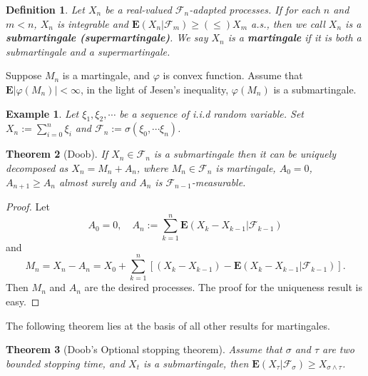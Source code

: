\documentclass[twoside, 12pt]{book}
\numberwithin{equation}{chapter}
\newtheorem{theorem}{Theorem}[section]
\newtheorem{definition}[theorem]{Definition}
\newtheorem{example}{Example}
\def\cF{{\mathcal F}}
\def\bE{{\mathbf E}}
\def\l{\left}
\def\r{\right}
\def\geq{\geqslant}
\def\leq{\leqslant}
\begin{document}
	\begin{definition}
		Let $X_n$ be a real-valued $\cF_n$-adapted processes. If for each $n$ and $m<n$, $X_n$ is integrable and $\bE(X_n | \cF_m) \geq (\leq) X_m$ a.s., then we call $X_n$ is a {\bf submartingale (supermartingale)}. We say $X_n$ is a {\bf martingale} if it is both a submartingale and a supermartingale. 
	\end{definition}
	Suppose $M_n$ is a martingale, and $\varphi$ is convex function. Assume that $\bE |\varphi(M_n)|<\infty$, in the light of Jesen's inequality, $\varphi(M_n)$ is a submartingale. 
	
	\begin{example}
		Let $\xi_1, \xi_2, \cdots$ be a sequence of i.i.d random variable. Set $X_n:=\sum_{i=0}^n \xi_i$ and $\cF_n:=\sigma(\xi_0,\cdots \xi_n)$. 
	\end{example}
	
 
	\begin{theorem}[Doob]\label{thm:Doob-D}
 If $X_n\in \cF_n$  is a submartingale then it can be uniquely decomposed as $X_n=M_n+A_n$, where $M_n\in \cF_n$ is martingale, $A_0=0$, $A_{n+1}\geq A_n$ almost surely and $A_n$ is $\cF_{n-1}$-measurable.
	\end{theorem}
	\begin{proof}
		Let 
		\begin{equation*}
			A_0=0, \quad A_n:=\sum_{k=1}^n\bE (X_{k}-X_{k-1}|\cF_{k-1})
		\end{equation*}
		and 
		\[
		    M_n=X_n-A_n= X_0+ \sum_{k=1}^n \l[ (X_k-X_{k-1})- \bE (X_{k}-X_{k-1}|\cF_{k-1})\r]. 
		\]
		Then $M_n$ and $A_n$ are the desired processes. The proof for the uniqueness result is easy. 
	\end{proof}
	
	The following theorem lies at the basis of all other results for
	martingales.
	\begin{theorem}[Doob's Optional stopping theorem]\label{thm:Doob}
		Assume that $\sigma$ and $\tau$ are two bounded stopping time, and $X_t$ is a submartingale, then $\bE (X_{\tau}|\cF_{\sigma}) \geq  X_{\sigma\wedge \tau}$.  
	\end{theorem}
	
\end{document}
